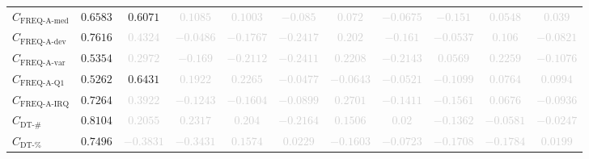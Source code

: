 \documentclass{standalone}
\newcommand{\actfreqmedianname}{\text{FREQ-A-med}}
\newcommand{\actfreqmedian}{C_{\actfreqmedianname}}
\newcommand{\actfreqdevname}{\text{FREQ-A-dev}}
\newcommand{\actfreqdev}{C_{\actfreqdevname}}
\newcommand{\actfreqvarname}{\text{FREQ-A-var}}
\newcommand{\actfreqvar}{C_{\actfreqvarname}}
\newcommand{\actfreqqonename}{\text{FREQ-A-Q1}}
\newcommand{\actfreqqone}{C_{\actfreqqonename}}
\newcommand{\actfreqiqrname}{\text{FREQ-A-IRQ}}
\newcommand{\actfreqiqr}{C_{\actfreqiqrname}}
\newcommand{\numberuniquetracesname}{\text{DT-\#}}
\newcommand{\numberuniquetraces}{C_{\numberuniquetracesname}}
\newcommand{\percentageuniquetracesname}{\text{DT-\%}}
\newcommand{\percentageuniquetraces}{C_{\percentageuniquetracesname}}
\begin{document}
\begin{tabular}{lcccccccccc}
$\actfreqmedian$ & $0.6583$ & $0.6071$ & \textcolor{lightgray}{$0.1085$} & \textcolor{lightgray}{$0.1003$} & \textcolor{lightgray}{$-0.085$} & \textcolor{lightgray}{$0.072$} & \textcolor{lightgray}{$-0.0675$} & \textcolor{lightgray}{$-0.151$} & \textcolor{lightgray}{$0.0548$} & \textcolor{lightgray}{$0.039$} \\ 
$\actfreqdev$ & $0.7616$ & \textcolor{lightgray}{$0.4324$} & \textcolor{lightgray}{$-0.0486$} & \textcolor{lightgray}{$-0.1767$} & \textcolor{lightgray}{$-0.2417$} & \textcolor{lightgray}{$0.202$} & \textcolor{lightgray}{$-0.161$} & \textcolor{lightgray}{$-0.0537$} & \textcolor{lightgray}{$0.106$} & \textcolor{lightgray}{$-0.0821$} \\ 
$\actfreqvar$ & $0.5354$ & \textcolor{lightgray}{$0.2972$} & \textcolor{lightgray}{$-0.169$} & \textcolor{lightgray}{$-0.2112$} & \textcolor{lightgray}{$-0.2411$} & \textcolor{lightgray}{$0.2208$} & \textcolor{lightgray}{$-0.2143$} & \textcolor{lightgray}{$0.0569$} & \textcolor{lightgray}{$0.2259$} & \textcolor{lightgray}{$-0.1076$} \\ 
$\actfreqqone$ & $0.5262$ & $0.6431$ & \textcolor{lightgray}{$0.1922$} & \textcolor{lightgray}{$0.2265$} & \textcolor{lightgray}{$-0.0477$} & \textcolor{lightgray}{$-0.0643$} & \textcolor{lightgray}{$-0.0521$} & \textcolor{lightgray}{$-0.1099$} & \textcolor{lightgray}{$0.0764$} & \textcolor{lightgray}{$0.0994$} \\ 
$\actfreqiqr$ & $0.7264$ & \textcolor{lightgray}{$0.3922$} & \textcolor{lightgray}{$-0.1243$} & \textcolor{lightgray}{$-0.1604$} & \textcolor{lightgray}{$-0.0899$} & \textcolor{lightgray}{$0.2701$} & \textcolor{lightgray}{$-0.1411$} & \textcolor{lightgray}{$-0.1561$} & \textcolor{lightgray}{$0.0676$} & \textcolor{lightgray}{$-0.0936$} \\ 
$\numberuniquetraces$ & $0.8104$ & \textcolor{lightgray}{$0.2055$} & \textcolor{lightgray}{$0.2317$} & \textcolor{lightgray}{$0.204$} & \textcolor{lightgray}{$-0.2164$} & \textcolor{lightgray}{$0.1506$} & \textcolor{lightgray}{$0.02$} & \textcolor{lightgray}{$-0.1362$} & \textcolor{lightgray}{$-0.0581$} & \textcolor{lightgray}{$-0.0247$} \\ 
$\percentageuniquetraces$ & $0.7496$ & \textcolor{lightgray}{$-0.3831$} & \textcolor{lightgray}{$-0.3431$} & \textcolor{lightgray}{$0.1574$} & \textcolor{lightgray}{$0.0229$} & \textcolor{lightgray}{$-0.1603$} & \textcolor{lightgray}{$-0.0723$} & \textcolor{lightgray}{$-0.1708$} & \textcolor{lightgray}{$-0.1784$} & \textcolor{lightgray}{$0.0199$} \\ 

\end{tabular}
\end{document}
